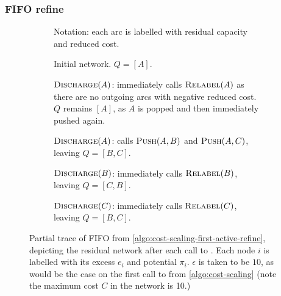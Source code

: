 \subsubsection{FIFO refine} \label{sec:impl-cs-impl-fifo}

\begin{figure}
    \begin{subfigure}[c]{0.5\textwidth}
        \centering
        
        \caption{Notation: each arc is labelled with residual capacity and reduced cost.} 
        \label{fig:cs-trace:key}
    \end{subfigure}
    \begin{subfigure}[c]{0.5\textwidth}
        
        \caption{Initial network. $Q = \left[A\right]$.}
        \label{fig:cs-trace:initial}        
    \end{subfigure}
    \begin{subfigure}[c]{0.5\textwidth}
        
        \caption{$\textproc{Discharge}(A)$: immediately calls $\textproc{Relabel}(A)$ as there are no outgoing arcs with negative reduced cost. $Q$ remains $\left[A\right]$, as $A$ is popped and then immediately pushed again.}
        \label{fig:cs-trace:first}
    \end{subfigure}
    \begin{subfigure}[c]{0.5\textwidth}
        
        \caption{$\textproc{Discharge}(A)$: calls $\textproc{Push}(A,B)$ and $\textproc{Push}(A,C)$, leaving $Q = \left[B,C\right]$.}
        \label{fig:cs-trace:second}        
    \end{subfigure}
    \begin{subfigure}[c]{0.5\textwidth}
        
        \caption{$\textproc{Discharge}(B)$: immediately calls $\textproc{Relabel}(B)$, leaving $Q = \left[C,B\right]$.}
        \label{fig:cs-trace:third}
    \end{subfigure}
    \begin{subfigure}[c]{0.5\textwidth}
       
        \caption{$\textproc{Discharge}(C)$: immediately calls $\textproc{Relabel}(C)$, leaving $Q = \left[B,C\right]$.}
        \label{fig:cs-trace:fourth}
    \end{subfigure}
    \caption[Cost scaling in action with FIFO vertex queue]{Partial trace of FIFO  from \cref{algo:cost-scaling-first-active-refine}, depicting the residual network after each call to . Each node $i$ is labelled with its excess $e_i$ and potential $\pi_i$. $\epsilon$ is taken to be $10$, as would be the case on the first call to  from \cref{algo:cost-scaling} (note the maximum cost $C$ in the network is 10.)}
    \label{fig:cs-trace}
\end{figure}

